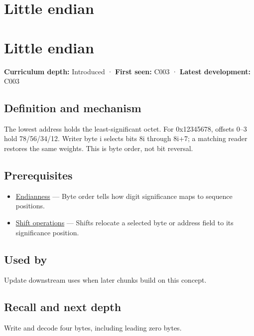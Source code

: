 \hypertarget{appendix-367b6abf460e}{}
\section*{Little endian}
\section{Little endian}\label{little-endian}

\textbf{Curriculum depth:} Introduced · \textbf{First seen:} C003 · \textbf{Latest development:} C003

\subsection{Definition and mechanism}\label{definition-and-mechanism}

The lowest address holds the least-significant octet. For 0x12345678, offsets 0--3 hold 78/56/34/12. Writer byte i selects bits 8i through 8i+7; a matching reader restores the same weights. This is byte order, not bit reversal.

\subsection{Prerequisites}\label{prerequisites}

\begin{itemize}
\tightlist
\item
  \hyperref[appendix-bc07c3d25b18]{Endianness} --- Byte order tells how digit significance maps to sequence positions.
\item
  \hyperref[appendix-73425b25118e]{Shift operations} --- Shifts relocate a selected byte or address field to its significance position.
\end{itemize}

\subsection{Used by}\label{used-by}

Update downstream uses when later chunks build on this concept.

\subsection{Recall and next depth}\label{recall-and-next-depth}

Write and decode four bytes, including leading zero bytes.

